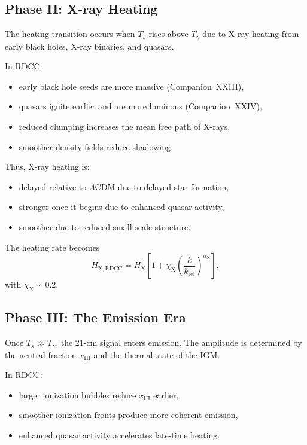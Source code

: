 \documentclass[11pt,a4paper]{article}
\begin{document}
\subsection{Phase II: X-ray Heating}

The heating transition occurs when $T_{s}$ rises above $T_{\gamma}$ due to X-ray heating from
early black holes, X-ray binaries, and quasars.

In RDCC:
\begin{itemize}
\item early black hole seeds are more massive (Companion~XXIII),
\item quasars ignite earlier and are more luminous (Companion~XXIV),
\item reduced clumping increases the mean free path of X-rays,
\item smoother density fields reduce shadowing.
\end{itemize}

Thus, X-ray heating is:
\begin{itemize}
\item delayed relative to $\Lambda$CDM due to delayed star formation,
\item stronger once it begins due to enhanced quasar activity,
\item smoother due to reduced small-scale structure.
\end{itemize}

The heating rate becomes
\begin{equation}
H_{\mathrm{X,RDCC}}
=
H_{\mathrm{X}}
\left[
1
+
\chi_{\mathrm{X}}
\left(
\frac{k}{k_{\mathrm{rel}}}
\right)^{\alpha_{\mathrm{X}}}
\right],
\end{equation}
with $\chi_{\mathrm{X}} \sim 0.2$.

\subsection{Phase III: The Emission Era}

Once $T_{s} \gg T_{\gamma}$, the 21-cm signal enters emission. The amplitude is determined by
the neutral fraction $x_{\mathrm{HI}}$ and the thermal state of the IGM.

In RDCC:
\begin{itemize}
\item larger ionization bubbles reduce $x_{\mathrm{HI}}$ earlier,
\item smoother ionization fronts produce more coherent emission,
\item enhanced quasar activity accelerates late-time heating.
\end{itemize}
\end{document}
